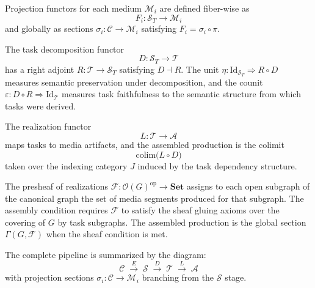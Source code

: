 \documentclass[12pt,a4paper]{article}
\begin{document}
Projection functors for each medium $\mathcal{M}_i$ are defined fiber-wise as
\[
F_i : \mathcal{S}_T \rightarrow \mathcal{M}_i
\]
and globally as sections $\sigma_i : \mathcal{C} \rightarrow \mathcal{M}_i$ satisfying $F_i = \sigma_i \circ \pi$.

The task decomposition functor
\[
D : \mathcal{S}_T \rightarrow \mathcal{T}
\]
has a right adjoint $R : \mathcal{T} \rightarrow \mathcal{S}_T$ satisfying $D \dashv R$. The unit $\eta : \mathrm{Id}_{\mathcal{S}_T} \Rightarrow R \circ D$ measures semantic preservation under decomposition, and the counit $\varepsilon : D \circ R \Rightarrow \mathrm{Id}_\mathcal{T}$ measures task faithfulness to the semantic structure from which tasks were derived.

The realization functor
\[
L : \mathcal{T} \rightarrow \mathcal{A}
\]
maps tasks to media artifacts, and the assembled production is the colimit
\[
\mathrm{colim}\bigl(L \circ D\bigr)
\]
taken over the indexing category $J$ induced by the task dependency structure.

The presheaf of realizations $\mathcal{F} : \mathcal{O}(G)^\mathrm{op} \rightarrow \mathbf{Set}$ assigns to each open subgraph of the canonical graph the set of media segments produced for that subgraph. The assembly condition requires $\mathcal{F}$ to satisfy the sheaf gluing axioms over the covering of $G$ by task subgraphs. The assembled production is the global section $\Gamma(G, \mathcal{F})$ when the sheaf condition is met.

The complete pipeline is summarized by the diagram:
\[
\mathcal{C}
\;\xrightarrow{E}\;
\mathcal{S}
\;\xrightarrow{D}\;
\mathcal{T}
\;\xrightarrow{L}\;
\mathcal{A}
\]
with projection sections $\sigma_i : \mathcal{C} \rightarrow \mathcal{M}_i$ branching from the $\mathcal{S}$ stage.
\end{document}

